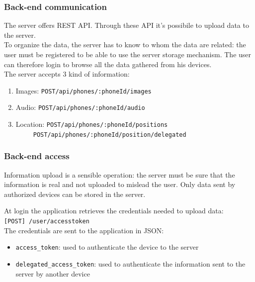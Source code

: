 \documentclass{beamer}
\begin{document}
\begin{frame}
\frametitle{Back-end communication}
The server offers REST API. Through these API it's possibile to upload data to the server.\\
To organize the data, the server has to know to whom the data are related: the user must be registered to be able to use the server storage mechanism. The user can therefore login to browse all the data gathered from his devices.\\
The server accepts 3 kind of information:
\begin{enumerate}
  \item Images: \texttt{\lbrack POST\rbrack	/api/phones/:phoneId/images}
  \item Audio: \texttt{\lbrack POST\rbrack 	/api/phones/:phoneId/audio}
  \item Location: \texttt{\lbrack POST\rbrack  /api/phones/:phoneId/positions}\\
                  ~~~~~\texttt{\lbrack POST\rbrack  /api/phones/:phoneId/position/delegated}
\end{enumerate}
\end{frame}

\begin{frame}
\frametitle{Back-end access}
\begin{block}{}
Information upload is a sensible operation: the server must be sure that the information is real and not uploaded to mislead the user. Only data sent by authorized devices can be stored in the server.
\end{block}
At login the application retrieves the credentials needed to upload data:\\
\texttt{[POST] /user/accesstoken}\\
The credentials are sent to the application in JSON:
\begin{itemize}
  \item \texttt{access\_token}: used to authenticate the device to the server
  \item \texttt{delegated\_access\_token}: used to authenticate the information sent to the server by another device
\end{itemize}
\end{frame}
\end{document}
